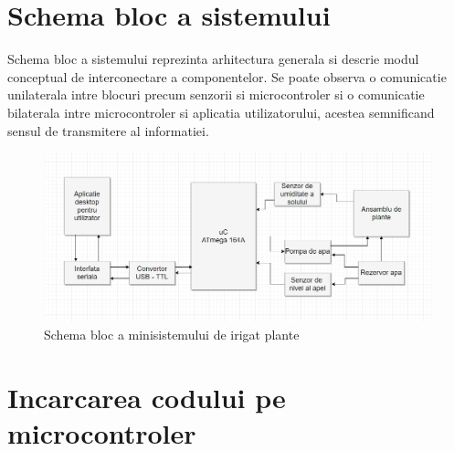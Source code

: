\documentclass[12pt]{article}
\begin{document}
\section{Schema bloc a sistemului}
\hspace{8 mm} Schema bloc a sistemului reprezinta arhitectura generala si descrie modul conceptual de interconectare a componentelor. Se poate observa o comunicatie unilaterala intre blocuri precum senzorii si microcontroler si o comunicatie bilaterala intre microcontroler si aplicatia utilizatorului, acestea semnificand sensul de transmitere al informatiei.
\\

\begin{figure}[H]
\centering
\includegraphics[width=\textwidth]{Pictures/schemaBloc.png}
\caption{Schema bloc a minisistemului de irigat plante}
\end{figure}

\vspace{4 mm}

\section{Incarcarea codului pe microcontroler}
\end{document}
